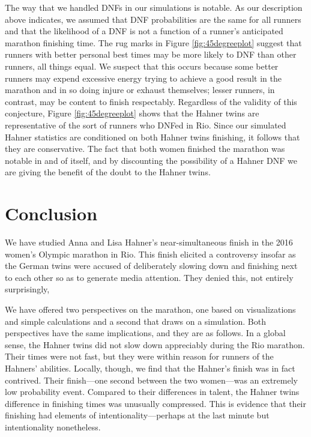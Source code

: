 \documentclass[12pt,titlepage]{article}
\begin{document}
The way that we handled DNFs in our simulations is notable. As our
description above indicates, we assumed that DNF probabilities are the
same for all runners and that the likelihood of a DNF is not a
function of a runner's anticipated marathon finishing time. The rug
marks in Figure \ref{fig:45degreeplot} suggest that runners with
better personal best times may be more likely to DNF than other
runners, all things equal. We suspect that this occurs because some
better runners may expend excessive energy trying to achieve a good
result in the marathon and in so doing injure or exhaust themselves;
lesser runners, in contrast, may be content to finish
respectably. Regardless of the validity of this conjecture, Figure
\ref{fig:45degreeplot} shows that the Hahner twins are representative
of the sort of runners who DNFed in Rio. Since our simulated Hahner
statistics are conditioned on both Hahner twins finishing, it follows
that they are conservative. The fact that both women finished the
marathon was notable in and of itself, and by discounting the
possibility of a Hahner DNF we are giving the benefit of the doubt to
the Hahner twins.

\section*{Conclusion}

We have studied Anna and Lisa Hahner's near-simultaneous finish in the
2016 women's Olympic marathon in Rio. This finish elicited a
controversy insofar as the German twins were accused of deliberately
slowing down and finishing next to each other so as to generate media
attention. They denied this, not entirely surprisingly,

We have offered two perspectives on the marathon, one based on
visualizations and simple calculations and a second that draws on a
simulation. Both perspectives have the same implications, and they are
as follows. In a global sense, the Hahner twins did not slow down
appreciably during the Rio marathon. Their times were not fast, but
they were within reason for runners of the Hahners' abilities.
Locally, though, we find that the Hahner's finish was in fact
contrived. Their finish---one second between the two women---was an
extremely low probability event. Compared to their differences in
talent, the Hahner twins difference in finishing times was unusually
compressed. This is evidence that their finishing had elements of
intentionality---perhaps at the last minute but intentionality
nonetheless.
\end{document}
